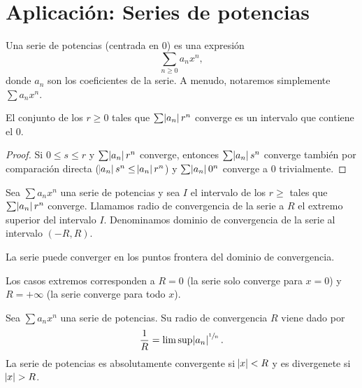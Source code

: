 \section{Aplicación: Series de potencias}

\begin{defi}
    Una serie de potencias (centrada en 0) es una expresión
    \[
        \sum_{n \geq 0} a_nx^n,
    \]
    donde $a_n$ son los coeficientes de la serie. A menudo, notaremos simplemente $\sum a_nx^n$.
\end{defi}

\begin{lema}
    El conjunto de los $r \geq 0$ tales
    que $\sum \abs{a_n}r^n$ converge es un intervalo que contiene el 0.
\end{lema}

\begin{proof}
    Si $0 \leq s \leq r$ y $\sum \abs{a_n}r^n$ converge, entonces $\sum \abs{a_n}s^n$
    converge también por comparación directa ($\abs{a_n}s^n \leq \abs{a_n}r^n$) y
    $\sum \abs{a_n}0^n$ converge a 0 trivialmente.
\end{proof}

\begin{defi}
    Sea $\sum a_nx^n$ una serie de potencias y sea $I$ el intervalo de los $r \geq$ tales que
    $\sum \abs{a_n}r^n$ converge. Llamamos radio de convergencia de la serie a $R$ el
    extremo superior del intervalo $I$. Denominamos dominio de convergencia de la serie
    al intervalo $(-R,R)$.
\end{defi}

\begin{obs}
    La serie puede converger en los puntos frontera del dominio de convergencia.
\end{obs}

\begin{obs}
    Los casos extremos corresponden a $R = 0$ (la serie solo converge para $x = 0$)
    y $R = +\infty$ (la serie converge para todo $x$).
\end{obs}

\begin{teo}
    Sea $\sum a_nx^n$ una serie de potencias. Su radio de convergencia $R$ viene dado por
    \[
        \frac{1}{R} = \limsup \abs{a_n}^{\sfrac{1}{n}}.
    \]
    La serie de potencias es absolutamente convergente si $\abs{x} < R$ y es divergenete
    si $\abs{x} > R$.
\end{teo}

